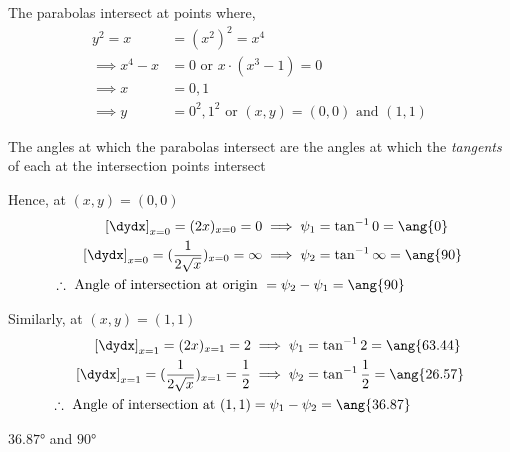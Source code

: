 \vspace{1cm}
\centerline{\box\figBoxA}

\begin{solution}[\fullpage]
	The parabolas intersect at points where, 
	\begin{align}
		y^2 = x &= (x^2)^2 = x^4 \\
		\implies x^4-x &= 0 \text{ or } x\cdot(x^3-1) = 0 \\
		\implies x &= 0,1 \\
		\implies y &= 0^2, 1^2 \text{ or } (x,y) = (0,0) \text{ and } (1,1)
	\end{align}
	
	The angles at which the parabolas intersect are the angles at which 
	the \textit{tangents} of each at the intersection points intersect
	
	Hence, at $(x,y) = (0,0)$
	\begin{align}
		\left[\dydx\right]_{x=0} = (2x)_{x=0} = 0 &\implies \psi_1 = \tan^{-1}0 = \ang{0} \\
		\left[\dydx\right]_{x=0} = (\dfrac{1}{2\sqrt{x}})_{x=0} = \infty &\implies \psi_2 
		= \tan^{-1}\infty = \ang{90} \\
		\therefore\text{ Angle of intersection at origin } &= \psi_2-\psi_1 = \ang{90}
	\end{align}
	
	Similarly, at $(x,y) = (1,1)$
	\begin{align}
		\left[\dydx\right]_{x=1} = (2x)_{x=1} = 2 &\implies \psi_1 = \tan^{-1}2 = \ang{63.44} \\
		\left[\dydx\right]_{x=1} = (\dfrac{1}{2\sqrt{x}})_{x=1} = \frac{1}{2} &\implies \psi_2 
		= \tan^{-1}\frac{1}{2} = \ang{26.57} \\
		\therefore\text{ Angle of intersection at }(1,1) &= \psi_1-\psi_2 = \ang{36.87}
	\end{align}
\end{solution}
\ifprintanswers\begin{codex}$\ang{36.87}$ and $\ang{90}$\end{codex}\fi
